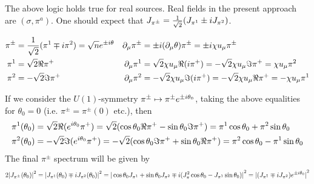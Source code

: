The above logic holds true for real sources. Real fields in the present approach are $(\sigma,\pi^a)$. One should expect that $J_{\pi^\pm}=\frac{1}{\sqrt{2}}(J_{\pi^1}\pm{i} J_{\pi^2})$.

\begin{subequations}
    \begin{align}
        \pi^\pm&=\frac{1}{\sqrt{2}}(\pi^1\mp{i}\pi^2)=\sqrt{n}e^{\pm{i}\theta}&\partial_\mu\pi^\pm&=\pm{i}(\partial_\mu\theta)\pi^\pm=\pm{i}\chi u_\mu\pi^\pm\\
        \pi^1&=\sqrt{2}\Re\pi^+&\partial_\mu\pi^1&=\sqrt{2}\chi u_\mu\Re({i}\pi^+)=-\sqrt{2}\chi u_\mu\Im\pi^+=\chi u_\mu\pi^2\\
        \pi^2&=-\sqrt{2}\Im\pi^+&\partial_\mu\pi^2&=-\sqrt{2}\chi u_\mu\Im({i}\pi^+)=-\sqrt{2}\chi u_\mu\Re\pi^+=-\chi u_\mu\pi^1        
    \end{align}
\end{subequations}

If we consider the $U(1)$-symmetry $\pi^\pm\mapsto\pi^\pm e^{\pm{i}\theta_0}$, taking the above equalities for $\theta_0=0$ (i.e. $\pi^\pm=\pi^\pm(0)$ etc.), then
\begin{subequations}
    \begin{align}
        \pi^1(\theta_0)&=\sqrt{2}\Re(e^{{i}\theta_0}\pi^+)=\sqrt{2}(\cos\theta_0\Re\pi^+-\sin\theta_0\Im\pi^+)=\pi^1\cos\theta_0+\pi^2\sin\theta_0\\
        \pi^2(\theta_0)&=-\sqrt{2}\Im(e^{{i}\theta_0}\pi^+)=-\sqrt{2}(\cos\theta_0\Im\pi^++\sin\theta_0\Re\pi^+)=\pi^2\cos\theta_0-\pi^1\sin\theta_0
    \end{align}
\end{subequations}
The final $\pi^\pm$ spectrum will be given by
\begin{equation}
    2{\vert J_{\pi^\pm}(\theta_0)\vert}^2={\vert J_{\pi^1}(\theta_0)\mp{i} J_{\pi^2}(\theta_0)\vert}^2={\vert\cos\theta_0J_{\pi^1}+\sin\theta_0J_{\pi^2}\mp{i}(J_\pi^2\cos\theta_0-J_{\pi^1}\sin\theta_0)\vert}^2={\vert(J_{\pi^1}\mp{i} J_{\pi^2})e^{\pm{i}\theta_0}\vert}^2
\end{equation}